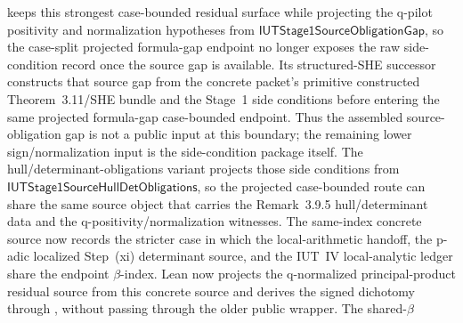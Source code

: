 \begin{proposition}
  keeps this strongest case-bounded residual surface while projecting the
  q-pilot positivity and normalization hypotheses from
  \(\mathsf{IUTStage1SourceObligationGap}\), so the case-split projected
  formula-gap endpoint no longer exposes the raw side-condition record once the
  source gap is available.
  Its structured-SHE successor
  constructs that source gap from the concrete packet's primitive constructed
  Theorem~3.11/SHE bundle and the Stage~1 side conditions before entering the
  same projected formula-gap case-bounded endpoint.  Thus the assembled
  source-obligation gap is not a public input at this boundary; the remaining
  lower sign/normalization input is the side-condition package itself.
  The hull/determinant-obligations variant
  projects those side conditions from
  \(\mathsf{IUTStage1SourceHullDetObligations}\), so the projected
  case-bounded route can share the same source object that carries the
  Remark~3.9.5 hull/determinant data and the q-positivity/normalization
  witnesses.
  The same-index concrete source
  now records the stricter case in which the local-arithmetic handoff, the
  p-adic localized Step~(xi) determinant source, and the IUT~IV local-analytic
  ledger share the endpoint \(\beta\)-index.  Lean now projects the
  q-normalized principal-product residual source from this concrete source and
  derives the signed dichotomy through
  ,
  without passing through the older public wrapper.  The shared-\(\beta\)

\end{proposition}

